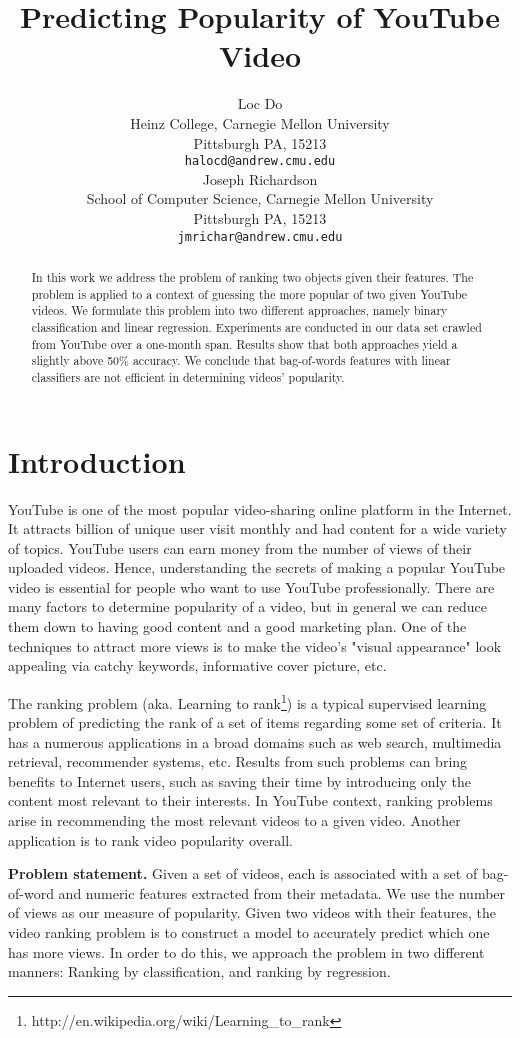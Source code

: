 \documentclass{article} %
\title{Predicting Popularity of YouTube Video}
\author{
Loc Do \\
Heinz College,
Carnegie Mellon University \\
Pittsburgh PA, 15213\\
\texttt{halocd@andrew.cmu.edu} \\
\And
Joseph Richardson \\
School of Computer Science,
Carnegie Mellon University \\
Pittsburgh PA, 15213 \\
\texttt{jmrichar@andrew.cmu.edu} \\
}
\begin{document}
\maketitle

\begin{abstract}
	In this work we address the problem of ranking two objects given their features. The problem is applied to a context of guessing the more popular of two given YouTube videos. We formulate this problem into two different approaches, namely binary classification and linear regression. Experiments are conducted in our data set crawled from YouTube over a one-month span. Results show that both approaches yield a slightly above 50\% accuracy. We conclude that bag-of-words features with linear classifiers are not efficient in determining videos' popularity.
\end{abstract}

\section{Introduction}
\label{sec:intro}
	YouTube is one of the most popular video-sharing online platform in the Internet. It attracts billion of unique user visit monthly and had content for a wide variety of topics. YouTube users can earn money from the number of views of their uploaded videos. Hence, understanding the secrets of making a popular YouTube video is essential for people who want to use YouTube professionally. There are many factors to determine popularity of a video, but in general we can reduce them down to having good content and a good marketing plan. One of the techniques to attract more views is to make the video's "visual appearance" look appealing via catchy keywords, informative cover picture, etc.

	The ranking problem (aka. Learning to rank\footnote{http://en.wikipedia.org/wiki/Learning\_to\_rank}) is a typical supervised learning problem of predicting the rank of a set of items regarding some set of criteria. It has a numerous applications in a broad domains such as web search, multimedia retrieval, recommender systems, etc. Results from such problems can bring benefits to Internet users, such as saving their time by introducing only the content most relevant to their interests. In YouTube context, ranking problems arise in recommending the most relevant videos to a given video. Another application is to rank video popularity overall.

	\textbf{Problem statement.} Given a set of videos, each is associated with a set of bag-of-word and numeric features extracted from their metadata. We use the number of views as our measure of popularity. Given two videos with their features, the video ranking problem is to construct a model to accurately predict which one has more views.  In order to do this, we approach the problem in two different manners:  Ranking by classification, and ranking by regression.
\end{document}
